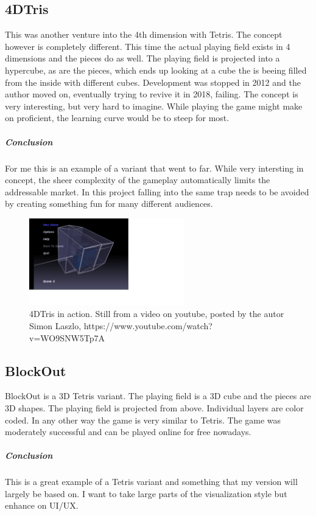 \documentclass{article}
\begin{document}
\subsection{4DTris}
This was another venture into the 4th dimension with Tetris. The concept however is completely different. This time the actual playing field exists in 4 dimensions and the pieces do as well. The playing field is projected into a hypercube, as are the pieces, which ends up looking at a cube the is beeing filled from the inside with different cubes. Development was stopped in 2012 and the author moved on, eventually trying to revive it in 2018, failing. The concept is very interesting, but very hard to imagine. While playing the game might make on proficient, the learning curve would be to steep for most.
\subparagraph*{Conclusion}
For me this is an example of a variant that went to far. While very intersting in concept, the sheer complexity of the gameplay automatically limits the addressable market. In this project falling into the same trap needs to be avoided by creating something fun for many different audiences.
\begin{figure}
    \label{fig:4dtris}
    \centering
    \includegraphics[width=0.6\textwidth]{4dtris.png}
    \caption{4DTris in action. Still from a video on youtube, posted by the autor Simon Laszlo, https://www.youtube.com/watch?v=WO9SNW5Tp7A}
\end{figure}
\subsection{BlockOut}
BlockOut is a 3D Tetris variant. The playing field is a 3D cube and the pieces are 3D shapes. 
The playing field is projected from above. Individual layers are color coded. In any other way the game is very similar to Tetris. The game was moderately successful and can be played online for free nowadays.
\subparagraph*{Conclusion}
This is a great example of a Tetris variant and something that my version will largely be based on. I want to take large parts of the visualization style but enhance on UI/UX.
\end{document}
